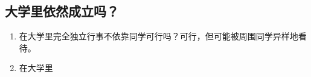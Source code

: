     \subsection{大学里依然成立吗？}\label{subsec:Uncategorized/IsUniversityInterpersonImportant/IsItInUniversity}
        \begin{enumerate}
            \item 在大学里完全独立行事不依靠同学可行吗？可行，但可能被周围同学异样地看待。
            \item 在大学里
        \end{enumerate}
